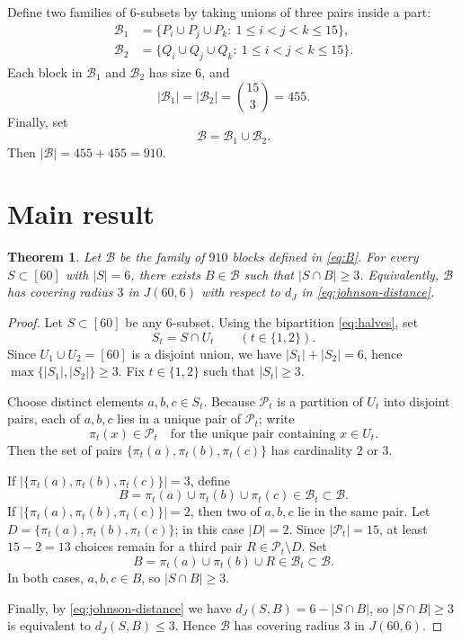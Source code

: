 \documentclass[11pt]{article}
\newtheorem{theorem}{Theorem}
\begin{document}
Define two families of $6$-subsets by taking unions of three pairs inside a part:
\begin{align}
\mathcal{B}_1&=\{P_i\cup P_j\cup P_k:\ 1\le i<j<k\le 15\},\label{eq:B1}\\
\mathcal{B}_2&=\{Q_i\cup Q_j\cup Q_k:\ 1\le i<j<k\le 15\}.\label{eq:B2}
\end{align}
Each block in $\mathcal{B}_1$ and $\mathcal{B}_2$ has size $6$, and
\begin{equation}\label{eq:size}
|\mathcal{B}_1|=|\mathcal{B}_2|=\binom{15}{3}=455.
\end{equation}
Finally, set
\begin{equation}\label{eq:B}
\mathcal{B}=\mathcal{B}_1\cup \mathcal{B}_2.
\end{equation}
Then $|\mathcal{B}|=455+455=910$.


\section{Main result}

\begin{theorem}\label{thm:main}
Let $\mathcal{B}$ be the family of $910$ blocks defined in \eqref{eq:B}.
For every $S\subset[60]$ with $|S|=6$, there exists $B\in\mathcal{B}$ such that $|S\cap B|\ge 3$.
Equivalently, $\mathcal{B}$ has covering radius $3$ in $J(60,6)$ with respect to $d_J$ in \eqref{eq:johnson-distance}.
\end{theorem}
\begin{proof}
Let $S\subset[60]$ be any $6$-subset. Using the bipartition \eqref{eq:halves}, set
\[
S_t=S\cap U_t\qquad (t\in\{1,2\}).
\]
Since $U_1\cup U_2=[60]$ is a disjoint union, we have $|S_1|+|S_2|=6$, hence
$\max\{|S_1|,|S_2|\}\ge 3$. Fix $t\in\{1,2\}$ such that $|S_t|\ge 3$.

Choose distinct elements $a,b,c\in S_t$. Because $\mathcal{P}_t$ is a partition of $U_t$ into disjoint pairs,
each of $a,b,c$ lies in a unique pair of $\mathcal{P}_t$; write
\[
\pi_t(x)\in\mathcal{P}_t\quad\text{for the unique pair containing }x\in U_t.
\]
Then the set of pairs $\{\pi_t(a),\pi_t(b),\pi_t(c)\}$ has cardinality $2$ or $3$.

If $|\{\pi_t(a),\pi_t(b),\pi_t(c)\}|=3$, define
\[
B=\pi_t(a)\cup \pi_t(b)\cup \pi_t(c)\in\mathcal{B}_t\subset\mathcal{B}.
\]
If $|\{\pi_t(a),\pi_t(b),\pi_t(c)\}|=2$, then two of $a,b,c$ lie in the same pair.
Let $D=\{\pi_t(a),\pi_t(b),\pi_t(c)\}$; in this case $|D|=2$.
Since $|\mathcal{P}_t|=15$, at least $15-2=13$ choices remain for a third pair $R\in\mathcal{P}_t\setminus D$.
Set
\[
B=\pi_t(a)\cup \pi_t(b)\cup R\in\mathcal{B}_t\subset\mathcal{B}.
\]
In both cases, $a,b,c\in B$, so $|S\cap B|\ge 3$.

Finally, by \eqref{eq:johnson-distance} we have $d_J(S,B)=6-|S\cap B|$, so $|S\cap B|\ge 3$
is equivalent to $d_J(S,B)\le 3$. Hence $\mathcal{B}$ has covering radius $3$ in $J(60,6)$.
\end{proof}
\end{document}
